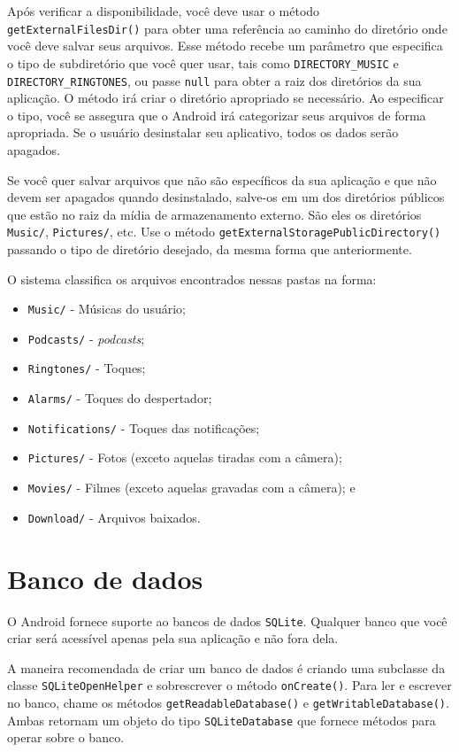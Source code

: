 \documentclass[a4paper,12pt,brazil,oneside]{book}
\begin{document}
		Após verificar a disponibilidade, você deve usar o método \texttt{getExternalFilesDir()} para obter uma referência ao caminho do diretório onde você deve salvar seus arquivos. Esse método recebe um parâmetro que especifica o tipo de subdiretório que você quer usar, tais como \texttt{DIRECTORY\_MUSIC} e \texttt{DIRECTORY\_RINGTONES}, ou passe \texttt{null} para obter a raiz dos diretórios da sua aplicação. O método irá criar o diretório apropriado se necessário. Ao especificar o tipo, você se assegura que o Android irá categorizar seus arquivos de forma apropriada. Se o usuário desinstalar seu aplicativo, todos os dados serão apagados.

		Se você quer salvar arquivos que não são específicos da sua aplicação e que não devem ser apagados quando desinstalado, salve-os em um dos diretórios públicos que estão no raiz da mídia de armazenamento externo. São eles os diretórios \texttt{Music/}, \texttt{Pictures/}, etc. Use o método \texttt{getExternalStoragePublicDirectory()} passando o tipo de diretório desejado, da mesma forma que anteriormente.

		O sistema classifica os arquivos encontrados nessas pastas na forma:

		\begin{itemize}
			\item \texttt{Music/} - Músicas do usuário;
			\item \texttt{Podcasts/} - \emph{podcasts};
			\item \texttt{Ringtones/} - Toques;
			\item \texttt{Alarms/} - Toques do despertador;
			\item \texttt{Notifications/} - Toques das notificações;
			\item \texttt{Pictures/} - Fotos (exceto aquelas tiradas com a câmera);
			\item \texttt{Movies/} - Filmes (exceto aquelas gravadas com a câmera); e
			\item \texttt{Download/} - Arquivos baixados.
		\end{itemize}

		\section{Banco de dados}

		O Android fornece suporte ao bancos de dados \texttt{SQLite}. Qualquer banco que você criar será acessível apenas pela sua aplicação e não fora dela.

		A maneira recomendada de criar um banco de dados é criando uma subclasse da classe \texttt{SQLiteOpenHelper} e sobrescrever o método \texttt{onCreate()}. Para ler e escrever no banco, chame os métodos \texttt{getReadableDatabase()} e \texttt{getWritableDatabase()}. Ambas retornam um objeto do tipo \texttt{SQLiteDatabase} que fornece métodos para operar sobre o banco.
\end{document}
